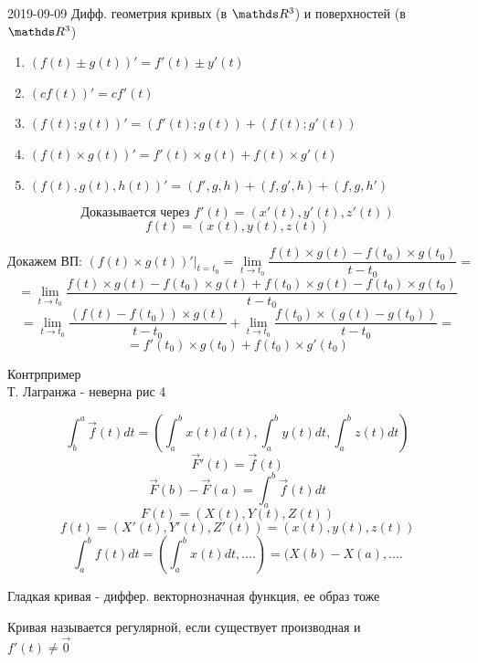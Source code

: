 \documentclass[main]{subfiles}
\begin{document}
\begin{lect}{2019-09-09 Дифф. геометрия кривых (в $\R^3$) и поверхностей (в $\R^3$)}
    \begin{theorem} [свойства]
    		\begin{enumerate}
    			\item $(f(t) \pm g(t))' = f'(t) \pm y'(t)$
    			\item $(c f(t))' = cf'(t)$
    			\item $(f(t); g(t))' = (f'(t); g(t)) + (f(t); g'(t))$
    			\item $(f(t) \times g(t))' = f'(t) \times g(t) + f(t) \times g'(t)$
    			\item $(f(t), g(t), h(t))' = (f', g, h) + (f, g', h) + (f, g, h')$
    		\end{enumerate}

    		\[\text{Доказывается через }f'(t) = (x'(t), y'(t), z'(t))\]
    		\[f(t) = (x(t), y(t), z(t))\]

    		\[\text{Докажем ВП: }(f(t) \times g(t))'|_{t = t_0} = \lim_{t \to t_0} \frac{f(t) \times g(t) - f(t_0) \times g(t_0)}{t - t_0} = \]
    		\[= \lim_{t \to t_0} \frac{f(t) \times g(t) - f(t_0) \times g(t) + f(t_0) \times g(t) - f(t_0) \times g(t_0)}{t - t_0}\]
    		\[= \lim_{t \to t_0} \frac{(f(t) - f(t_0)) \times g(t)}{t - t_0} +
    		\lim_{t \to t_0} \frac{f(t_0) \times (g(t) - g(t_0))}{t - t_0} = \]
    		\[= f'(t_0) \times g(t_0) + f(t_0) \times g'(t_0)\]
    \end{theorem}

    \begin{example}
    		Контрпример\\
    		Т. Лагранжа  - неверна рис 4
    \end{example}

    \[\int_b^a \overrightarrow{f}(t) dt = (\int_a^b x(t)d(t), \int_a^b y(t)dt, \int_a^b z(t)dt) \]
    \[\overrightarrow{F}'(t) = \overrightarrow{f}(t)\]
    \[\overrightarrow{F}(b) - \overrightarrow{F}(a) = \int_a^b \overrightarrow{f}(t)dt\]
    \[F(t) = (X(t), Y(t), Z(t))\]
    \[f(t) = (X'(t), Y'(t), Z'(t)) = (x(t), y(t), z(t))\]
    \[\int_a^b f(t)dt = (\int_a^b x(t) dt, ....) = (X(b) - X(a), ....\]

    \begin{definition}
        Гладкая кривая - диффер. векторнозначная функция, ее образ тоже
    \end{definition}

    \begin{definition}
        Кривая называется регулярной, если существует производная и\\
    	$f'(t) \neq \overrightarrow{0}$
    \end{definition}


\end{lect}
\end{document}
